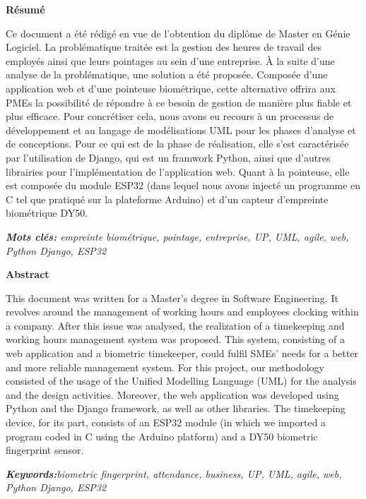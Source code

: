 \renewcommand{\headrulewidth}{0pt}
\fancyhead[R]{}

\begin{titlepage}
\newpage
\pagestyle{fancy}      
\lhead{}  
\chead{}     
\rhead{}     

\renewcommand{\headrulewidth}{0.5pt}

\begin{center}\huge{\textbf{Résumé}} \\ \end{center} 

Ce document a été rédigé en vue de l’obtention du diplôme de Master en Génie
Logiciel. La problématique traitée est la gestion des heures de travail des
employés ainsi que leurs pointages au sein d’une entreprise. À la suite
d’une analyse de la problématique, une solution a été proposée. Composée
d’une application web et d’une pointeuse biométrique, cette alternative
offrira aux PMEs la possibilité de répondre à ce besoin de gestion de
manière plus fiable et plus efficace. Pour concrétiser cela, nous avons eu
recours à un processus de développement et au langage de modélisations UML
pour les phases d’analyse et de conceptions. Pour ce qui est de la phase de
réalisation, elle s’est caractérisée par l’utilisation de Django, qui est un
framwork Python, ainsi que d’autres librairies pour l’implémentation de
l’application web. Quant à la pointeuse, elle est composée du module ESP32
(dans lequel nous avons injecté un programme en C tel que pratiqué sur la
plateforme Arduino) et d’un capteur d’empreinte biométrique DY50.  

\emph{\textbf{Mots clés:} empreinte biométrique, pointage, entreprise, UP, UML, 
    agile, web, Python Django, ESP32}

\vspace{-20pt}
\begin{center}\huge{\textbf{Abstract}} \\ \end{center}

This document was written for a Master’s degree in Software Engineering. It
revolves around the management of working hours and employees clocking within
a company. After this issue was analysed, the realization of a timekeeping
and working hours management system was proposed. This system, consisting of
a web application and a biometric timekeeper, could fulfil SMEs’ needs for a
better and more reliable management system. For this project, our methodology
consisted of the usage of the Unified Modelling Language (UML) for the analysis
and the design activities. Moreover, the web application was developed using
Python and the Django framework, as well as other libraries. The timekeeping
device, for its part, consists of an ESP32 module (in which we imported a
program coded in C using the Arduino platform) and a DY50 biometric
fingerprint sensor. 

\emph{\textbf{Keywords:}biometric fingerprint, attendance, business, UP, UML, 
    agile, web, Python Django, ESP32}

\end{titlepage}
